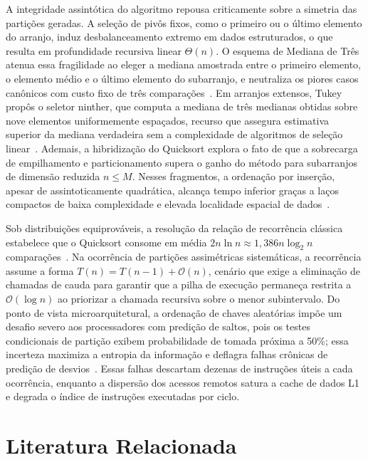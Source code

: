 \documentclass[12pt]{article}
\begin{document}
A integridade assintótica do algoritmo repousa criticamente sobre a simetria das partições geradas. A seleção de pivôs fixos, como o primeiro ou o último elemento do arranjo, induz desbalanceamento extremo em dados estruturados, o que resulta em profundidade recursiva linear $\Theta(n)$. O esquema de Mediana de Três atenua essa fragilidade ao eleger a mediana amostrada entre o primeiro elemento, o elemento médio e o último elemento do subarranjo, e neutraliza os piores casos canônicos com custo fixo de três comparações~\cite{Sedgewick1978}. Em arranjos extensos, Tukey propôs o seletor ninther, que computa a mediana de três medianas obtidas sobre nove elementos uniformemente espaçados, recurso que assegura estimativa superior da mediana verdadeira sem a complexidade de algoritmos de seleção linear~\cite{BentleyMcIlroy1993}. Ademais, a hibridização do Quicksort explora o fato de que a sobrecarga de empilhamento e particionamento supera o ganho do método para subarranjos de dimensão reduzida $n \le M$. Nesses fragmentos, a ordenação por inserção, apesar de assintoticamente quadrática, alcança tempo inferior graças a laços compactos de baixa complexidade e elevada localidade espacial de dados~\cite{Sedgewick1978,Knuth1998}.

Sob distribuições equiprováveis, a resolução da relação de recorrência clássica estabelece que o Quicksort consome em média $2n \ln n \approx 1{,}386 n \log_2 n$ comparações~\cite{Sedgewick1978}. Na ocorrência de partições assimétricas sistemáticas, a recorrência assume a forma $T(n) = T(n-1) + \mathcal{O}(n)$, cenário que exige a eliminação de chamadas de cauda para garantir que a pilha de execução permaneça restrita a $\mathcal{O}(\log n)$ ao priorizar a chamada recursiva sobre o menor subintervalo. Do ponto de vista microarquitetural, a ordenação de chaves aleatórias impõe um desafio severo aos processadores com predição de saltos, pois os testes condicionais de partição exibem probabilidade de tomada próxima a 50\%; essa incerteza maximiza a entropia da informação e deflagra falhas crônicas de predição de desvios~\cite{EdelkampWeiss2016}. Essas falhas descartam dezenas de instruções úteis a cada ocorrência, enquanto a dispersão dos acessos remotos satura a cache de dados L1 e degrada o índice de instruções executadas por ciclo.

\section{Literatura Relacionada}\label{sec:relacionados}
\end{document}
